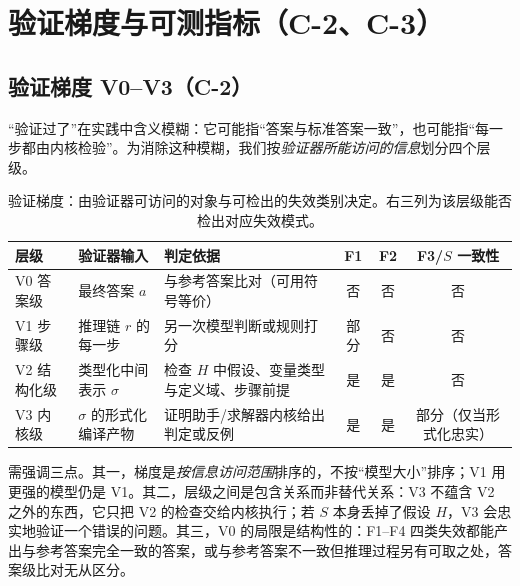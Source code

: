 \section{验证梯度与可测指标（C-2、C-3）}\label{sec:metrics}\label{sec:gradient}

\subsection{验证梯度 V0--V3（C-2）}

“验证过了”在实践中含义模糊：它可能指“答案与标准答案一致”，也可能指“每一步都由内核检验”。为消除这种模糊，我们按\emph{验证器所能访问的信息}划分四个层级。

\begin{table}[t]
\centering
\small
\caption{验证梯度：由验证器可访问的对象与可检出的失效类别决定。右三列为该层级能否检出对应失效模式。}
\label{tab:gradient}
\begin{tabularx}{\textwidth}{@{}l l >{\raggedright\arraybackslash}X c c c@{}}
\toprule
\textbf{层级} & \textbf{验证器输入} & \textbf{判定依据} & \textbf{F1} & \textbf{F2} & \textbf{F3/$S$ 一致性} \\
\midrule
V0 答案级 & 最终答案 $a$ & 与参考答案比对（可用符号等价） & 否 & 否 & 否 \\
V1 步骤级 & 推理链 $r$ 的每一步 & 另一次模型判断或规则打分 & 部分 & 否 & 否 \\
V2 结构化级 & 类型化中间表示 $\sigma$ & 检查 $H$ 中假设、变量类型与定义域、步骤前提 & 是 & 是 & 否 \\
V3 内核级 & $\sigma$ 的形式化编译产物 & 证明助手/求解器内核给出判定或反例 & 是 & 是 & 部分（仅当形式化忠实） \\
\bottomrule
\end{tabularx}
\end{table}

需强调三点。其一，梯度是\emph{按信息访问范围}排序的，不按“模型大小”排序；V1 用更强的模型仍是 V1。其二，层级之间是包含关系而非替代关系：V3 不蕴含 V2 之外的东西，它只把 V2 的检查交给内核执行；若 $S$ 本身丢掉了假设 $H$，V3 会忠实地验证一个错误的问题。其三，V0 的局限是结构性的：F1--F4 四类失效都能产出与参考答案完全一致的答案，或与参考答案不一致但推理过程另有可取之处，答案级比对无从区分。

